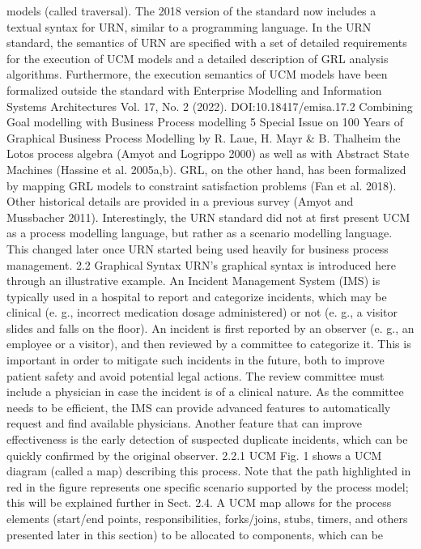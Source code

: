 models (called traversal). The 2018 version of the
standard now includes a textual syntax for URN,
similar to a programming language.
In the URN standard, the semantics of URN
are specified with a set of detailed requirements
for the execution of UCM models and a detailed
description of GRL analysis algorithms. Furthermore, the execution semantics of UCM models
have been formalized outside the standard with
Enterprise Modelling and Information Systems Architectures
Vol. 17, No. 2 (2022). DOI:10.18417/emisa.17.2
Combining Goal modelling with Business Process modelling 5
Special Issue on 100 Years of Graphical Business Process Modelling by R. Laue, H. Mayr & B. Thalheim
the Lotos process algebra (Amyot and Logrippo
2000) as well as with Abstract State Machines
(Hassine et al. 2005a,b). GRL, on the other hand,
has been formalized by mapping GRL models to
constraint satisfaction problems (Fan et al. 2018).
Other historical details are provided in a previous
survey (Amyot and Mussbacher 2011).
Interestingly, the URN standard did not at first
present UCM as a process modelling language,
but rather as a scenario modelling language. This
changed later once URN started being used heavily
for business process management.
2.2 Graphical Syntax
URN’s graphical syntax is introduced here through
an illustrative example. An Incident Management
System (IMS) is typically used in a hospital to
report and categorize incidents, which may be
clinical (e. g., incorrect medication dosage administered) or not (e. g., a visitor slides and falls on the
floor). An incident is first reported by an observer
(e. g., an employee or a visitor), and then reviewed
by a committee to categorize it. This is important
in order to mitigate such incidents in the future,
both to improve patient safety and avoid potential
legal actions. The review committee must include
a physician in case the incident is of a clinical
nature. As the committee needs to be efficient,
the IMS can provide advanced features to automatically request and find available physicians.
Another feature that can improve effectiveness
is the early detection of suspected duplicate incidents, which can be quickly confirmed by the
original observer.
2.2.1 UCM
Fig. 1 shows a UCM diagram (called a map)
describing this process. Note that the path highlighted in red in the figure represents one specific
scenario supported by the process model; this will
be explained further in Sect. 2.4.
A UCM map allows for the process elements
(start/end points, responsibilities, forks/joins,
stubs, timers, and others presented later in this section) to be allocated to components, which can be
